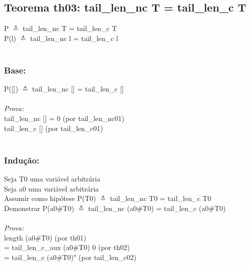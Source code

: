 \documentclass{article}
\begin{document}
\subsection{Teorema th03: tail\_len\_nc T = tail\_len\_c T}
P $\triangleq$ tail\_len\_nc T = tail\_len\_c T
\\P(l) $\triangleq$ tail\_len\_nc l = tail\_len\_c l
\\
\\\subsubsection{Base:} P([]) $\triangleq$ tail\_len\_nc [] = tail\_len\_c []
\\
\\\textit{Prova:}
\\tail\_len\_nc [] = 0 (por tail\_len\_nc01)
\\tail\_len\_c [] (por tail\_len\_c01)
\\
\\\subsubsection{Indução:}
Seja T0 uma variável arbitrária
\\Seja a0 uma variável arbitrária
\\Assumir como hipótese P(T0) $\triangleq$ tail\_len\_nc T0 = tail\_len\_c T0
\\Demonstrar P(a0\#T0) $\triangleq$ tail\_len\_nc (a0\#T0) = tail\_len\_c (a0\#T0)
\\
\\\textit{Prova:}
\\length (a0\#T0) (por th01)
\\= tail\_len\_c\_aux (a0\#T0) 0 (por th02)
\\= tail\_len\_c (a0\#T0)" (por tail\_len\_c02)
\end{document}
